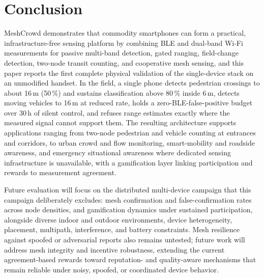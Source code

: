 \documentclass[conference,10pt]{IEEEtran}
\begin{document}
\section{Conclusion}
MeshCrowd demonstrates that commodity smartphones can form a practical,
infrastructure-free sensing platform by combining BLE and dual-band Wi-Fi
measurements for passive multi-band detection, gated ranging, field-change
detection, two-node transit counting, and cooperative mesh sensing, and this
paper reports the first complete physical validation of the single-device
stack on an unmodified handset. In the field, a single phone detects
pedestrian crossings to about 16\,m (50\,\%) and sustains classification above
80\,\% inside 6\,m, detects moving vehicles to 16\,m at reduced rate, holds a
zero-BLE-false-positive budget over 30\,h of silent control, and refuses
range estimates exactly where the measured signal cannot support them. The
resulting architecture supports applications ranging from two-node pedestrian
and vehicle counting at entrances and corridors, to urban crowd and flow
monitoring, smart-mobility and roadside awareness, and emergency situational
awareness where dedicated sensing infrastructure is unavailable, with a
gamification layer linking participation and rewards to measurement
agreement.

Future evaluation will focus on the distributed multi-device campaign that
this campaign deliberately excludes: mesh confirmation and false-confirmation
rates across node densities, and gamification dynamics under sustained
participation, alongside diverse indoor and outdoor environments, device
heterogeneity, placement, multipath, interference, and battery constraints.
Mesh resilience against spoofed or adversarial reports also remains untested;
future work will address mesh integrity and incentive robustness, extending
the current agreement-based rewards toward reputation- and quality-aware
mechanisms that remain reliable under noisy, spoofed, or coordinated device
behavior.
\end{document}
